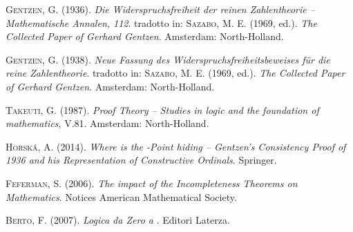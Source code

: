 
	\begin{thebibliography}{9}
    	
    	 \textsc{Gentzen}, G. (1936). \emph{Die Widerspruchsfreiheit der reinen Zahlentheorie -- Mathematische Annalen, 112}. tradotto in: \textsc{Sazabo}, M. E. (1969, ed.). \emph{The Collected Paper of Gerhard Gentzen}. Amsterdam: North-Holland.
    	
    	 \textsc{Gentzen}, G. (1938). \emph{Neue Fassung des Widerspruchsfreiheitsbeweises f\"ur die reine \mbox{Zahlentheorie}}. tradotto in: \textsc{Sazabo}, M. E. (1969, ed.). \emph{The Collected Paper of Gerhard Gentzen}. Amsterdam: North-Holland.
    	
    	 \textsc{Takeuti}, G. (1987). \emph{Proof Theory -- Studies in logic and the foundation of mathematics}, V.81. Amsterdam: North-Holland.
    	
    	 \textsc{Horská}, A. (2014). \emph{Where is the \Godel-Point hiding -- Gentzen’s Consistency Proof of 1936 and his Representation of Constructive Ordinals}. Springer.
    	
    	 \textsc{Feferman}, S. (2006). \emph{The impact of the Incompleteness Theorems on Mathematics}. Notices American Mathematical Society.
    	
    	 \textsc{Berto}, F. (2007). \emph{Logica da Zero a \Godel}. Editori Laterza.
    	
    	    	
	\end{thebibliography}
